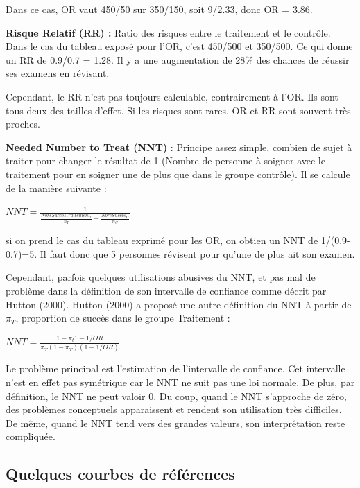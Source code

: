 \documentclass[
]{article}
\begin{document}
Dans ce cas, OR vaut 450/50 sur 350/150, soit 9/2.33, donc OR = 3.86.

\textbf{Risque Relatif (RR) :} Ratio des risques entre le traitement et
le contrôle. Dans le cas du tableau exposé pour l'OR, c'est 450/500 et
350/500. Ce qui donne un RR de 0.9/0.7 = 1.28. Il y a une augmentation
de 28\% des chances de réussir ses examens en révisant.

Cependant, le RR n'est pas toujours calculable, contrairement à l'OR.
Ils sont tous deux des tailles d'effet. Si les risques sont rares, OR et
RR sont souvent très proches.

\textbf{Needed Number to Treat (NNT)} : Principe assez simple, combien
de sujet à traiter pour changer le résultat de 1 (Nombre de personne à
soigner avec le traitement pour en soigner une de plus que dans le
groupe contrôle). Il se calcule de la manière suivante :

\begin{center}
  $NNT = \frac{1}{\frac{Nbre Succès_ Traitement_t}{n_T}-\frac{Nbre Succès_C}{n_C}}$
\end{center}

si on prend le cas du tableau exprimé pour les OR, on obtien un NNT de
1/(0.9-0.7)=5. Il faut donc que 5 personnes révisent pour qu'une de plus
ait son examen.

Cependant, parfois quelques utilisations abusives du NNT, et pas mal de
problème dans la définition de son intervalle de confiance comme décrit
par Hutton (2000). Hutton (2000) a proposé une autre définition du NNT à
partir de \(\pi_T\), proportion de succès dans le groupe Traitement :

\begin{center}
  $NNT=\frac{1-\pi_t{1-1/OR}}{\pi_T(1-\pi_T)(1-1/OR)}$
\end{center}

Le problème principal est l'estimation de l'intervalle de confiance. Cet
intervalle n'est en effet pas symétrique car le NNT ne suit pas une loi
normale. De plus, par définition, le NNT ne peut valoir 0. Du coup,
quand le NNT s'approche de zéro, des problèmes conceptuels apparaissent
et rendent son utilisation très difficiles. De même, quand le NNT tend
vers des grandes valeurs, son interprétation reste compliquée.

\hypertarget{quelques-courbes-de-ruxe9fuxe9rences}{%
\subsection{Quelques courbes de
références}\label{quelques-courbes-de-ruxe9fuxe9rences}}
\end{document}

